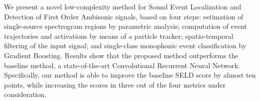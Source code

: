 
We present a novel low-complexity method for Sound Event Localization and Detection of First Order Ambisonic signals, based on four steps: estimation of single-source spectrogram regions by parametric analysis; computation of event trajectories and activations by means of a particle tracker; spatio-temporal filtering of the input signal; and single-class monophonic event classification by Gradient Boosting. 
Results show that the proposed method outperforms the baseline method, a state-of-the-art Convolutional Recurrent Neural Network. Specifically, our method is able to improve the baseline SELD score by almost ten points, while increasing the scores in three out of the four metrics under consideration.


